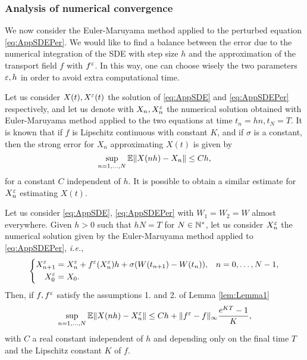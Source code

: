 \subsubsection{Analysis of numerical convergence}

We now consider the Euler-Maruyama method applied to the perturbed equation \eqref{eq:AppSDEPer}. We would like to find a balance between the error due to the numerical integration of the SDE with step size $h$ and the approximation of the transport field $f$ with $f^\varepsilon$. In this way, one can choose wisely the two parameters $\varepsilon, h$ in order to avoid extra computational time.

\noindent Let us consider $X(t), X^\varepsilon(t)$ the solution of \eqref{eq:AppSDE} and \eqref{eq:AppSDEPer} respectively, and let us denote with $X_n, X_n^\varepsilon$ the numerical solution obtained with Euler-Maruyama method applied to the two equations at time $t_n = hn, t_N = T$. It is known that if $f$ is Lipschitz continuous with constant $K$, and if $\sigma$ is a constant, then the strong error for $X_n$ approximating $X(t)$ is given by
\begin{equation}\label{eq:StrongEM}
	\sup_{n = 1, \dots, N} \mathbb{E} \|X(nh) - X_n\| \leq C h,
\end{equation}
for a constant $C$ independent of $h$. It is possible to obtain a similar estimate for $X_n^\varepsilon$ estimating $X(t)$. 
\begin{theorem}\label{thm:StrongConv} Let us consider \eqref{eq:AppSDE}, \eqref{eq:AppSDEPer} with $W_1 = W_2 = W$ almost everywhere. Given $h > 0$ such that $hN = T$ for $N \in \mathbb{N}^*$, let us consider $X_n^\varepsilon$ the numerical solution given by the Euler-Maruyama method applied to \eqref{eq:AppSDEPer}, \textit{i.e.},
\begin{equation*}
\left \{
\begin{aligned}
	X^\varepsilon_{n+1} &= X^\varepsilon_n + f^\varepsilon(X^\varepsilon_n)h + \sigma (W(t_{n+1}) - W(t_n)), && n = 0, \dots, N - 1, \\
	X^\varepsilon_0 &= X_0.
\end{aligned} \right .
\end{equation*}
Then, if $f, f^\varepsilon$ satisfy the assumptions 1. and 2. of Lemma \ref{lem:Lemma1}
\begin{equation}\label{eq:StrongConvEpl}
	\sup_{n = 1, \dots, N} \mathbb{E} \|X(nh) - X^\varepsilon_n\| \leq C h +  \|f^\varepsilon - f\|_{\infty} \frac{e^{KT} - 1}{K}, 
\end{equation}
with $C$ a real constant independent of $h$ and depending only on the final time $T$ and the Lipschitz constant $K$ of $f$.
\end{theorem}


